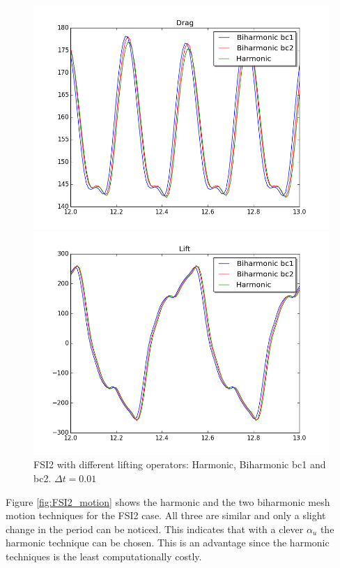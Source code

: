 \begin{figure}[H]
\begin{minipage}[b]{0.6\linewidth}
    \centering
    \includegraphics[scale=0.41]{./Verification_Validation/Mesh_motion_results/FSI2_dt001_drag.png} 
    \vspace{4ex}
  \end{minipage}%
  \begin{minipage}[b]{0.6\linewidth}
    \centering
    \includegraphics[scale=0.41]{./Verification_Validation/Mesh_motion_results/FSI2_dt001_lift.png} 
    \vspace{4ex}
  \end{minipage} 
\caption {FSI2 with different lifting operators: Harmonic, Biharmonic bc1 and bc2. $\Delta t = 0.01$}
\end{figure}

Figure \ref{fig:FSI2_motion} shows the harmonic and the two biharmonic mesh motion techniques for the FSI2 case. All three are similar and only a slight change in the period can be noticed. This indicates that with a clever $\alpha_u$ the harmonic technique can be chosen. This is an advantage since the harmonic techniques is the least computationally costly.








